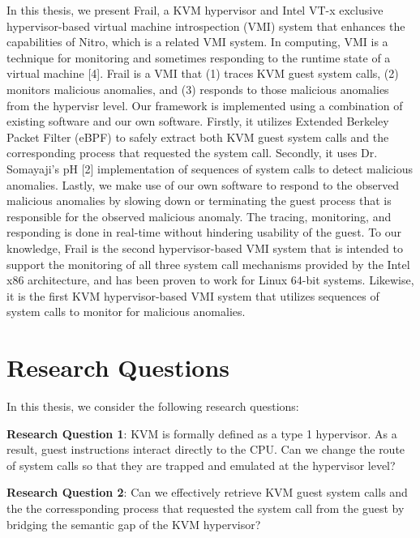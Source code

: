 \documentclass{report}
\begin{document}
\begin{spacing}{1.5}
{\large 
In this thesis, we present Frail, a KVM hypervisor and Intel VT-x exclusive hypervisor-based virtual machine introspection (VMI) system that enhances the capabilities of Nitro, which is a related VMI system. In computing, VMI is a technique for monitoring and sometimes responding to the runtime state of a virtual machine [4]. Frail is a VMI that (1) traces KVM guest system calls, (2) monitors malicious anomalies, and (3) responds to those malicious anomalies from the hypervisr level. Our framework is implemented using a combination of existing software and our own software. Firstly, it utilizes Extended Berkeley Packet Filter (eBPF) to safely extract both KVM guest system calls and the corresponding process that requested the system call. Secondly, it uses Dr. Somayaji's pH [2] implementation of sequences of system calls to detect malicious anomalies. Lastly, we make use of our own software to respond to the observed malicious anomalies by slowing down or terminating the guest process that is responsible for the observed malicious anomaly. The tracing, monitoring, and responding is done in real-time without hindering usability of the guest. To our knowledge, Frail is the second hypervisor-based VMI system that is intended to support the monitoring of all three system call mechanisms provided by the Intel x86 architecture, and has been proven to work for Linux 64-bit systems. Likewise, it is the first KVM hypervisor-based VMI system that utilizes sequences of system calls to monitor for malicious anomalies. 
\newline
}







\section{Research Questions}

{\large
In this thesis, we consider the following research questions:
\newline
}

{\large
\textbf{Research Question 1}: KVM is formally defined as a type 1 hypervisor. As a result, guest instructions interact directly to the CPU. Can we change the route of system calls so that they are trapped and emulated at the hypervisor level?
\newline
}

{\large
\textbf{Research Question 2}: Can we effectively retrieve KVM guest system calls and the the corressponding process that requested the system call from the guest by bridging the semantic gap of the KVM hypervisor?
\newline
}



\end{spacing}
\end{document}
